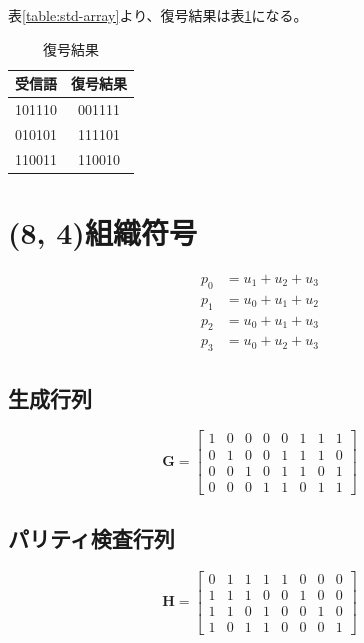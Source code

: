 \documentclass[a4paper,11pt]{jsarticle}
\begin{document}
表\ref{table:std-array}より、復号結果は表\ref{table:decoded}になる。

\begin{table}[hbtp]
  \caption{復号結果}
  \label{table:decoded}
  \centering
  \begin{tabular}{|cc|}
    \hline
    受信語 & 復号結果 \\ \hline \hline
    101110 & 001111 \\ \hline
    010101 & 111101 \\ \hline
    110011 & 110010 \\ \hline
  \end{tabular}
\end{table}

\section{(8, 4)組織符号}
\begin{eqnarray*}
  p_0 &= u_1 + u_2 + u_3 \\
  p_1 &= u_0 + u_1 + u_2 \\
  p_2 &= u_0 + u_1 + u_3 \\
  p_3 &= u_0 + u_2 + u_3
\end{eqnarray*}
\subsection{生成行列}
\begin{equation*}
  {\bm G}=
  \begin{bmatrix}
    1 & 0 & 0 & 0 & 0 & 1 & 1 & 1 \\
    0 & 1 & 0 & 0 & 1 & 1 & 1 & 0 \\
    0 & 0 & 1 & 0 & 1 & 1 & 0 & 1 \\
    0 & 0 & 0 & 1 & 1 & 0 & 1 & 1
  \end{bmatrix}
\end{equation*}

\subsection{パリティ検査行列}
\begin{equation}
  \label{eq:parity-check-matrix}
  {\bm H}=
  \begin{bmatrix}
    0 & 1 & 1 & 1 & 1 & 0 & 0 & 0 \\
    1 & 1 & 1 & 0 & 0 & 1 & 0 & 0 \\
    1 & 1 & 0 & 1 & 0 & 0 & 1 & 0 \\
    1 & 0 & 1 & 1 & 0 & 0 & 0 & 1
  \end{bmatrix}
\end{equation}
\end{document}
